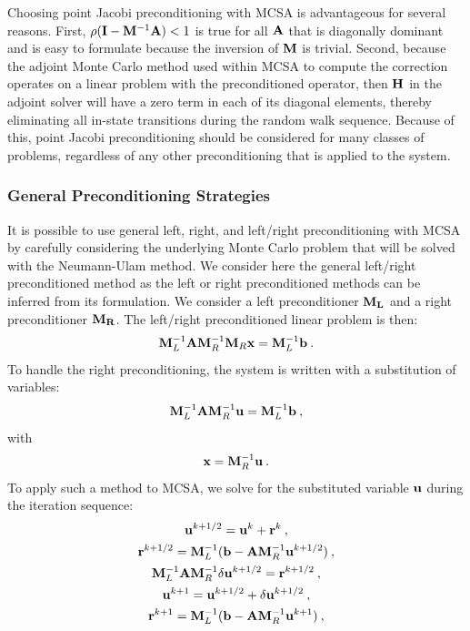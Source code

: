 Choosing point Jacobi preconditioning with MCSA is advantageous for
several reasons. First, $\rho(\mathbf{I} - \mathbf{M}^{-1}\mathbf{A}) < 1$ is true
for all $\mathbf{A}$ that is diagonally dominant and is easy to formulate
because the inversion of $\mathbf{M}$ is trivial. Second, because the
adjoint Monte Carlo method used within MCSA to compute the correction
operates on a linear problem with the preconditioned operator, then
$\mathbf{H}$ in the adjoint solver will have a zero term in each of its
diagonal elements, thereby eliminating all in-state transitions during
the random walk sequence. Because of this, point Jacobi
preconditioning should be considered for many classes of problems,
regardless of any other preconditioning that is applied to the
system.

\subsubsection{General Preconditioning Strategies}
\label{subsubsec:general_mcsa_preconditioning}
It is possible to use general left, right, and left/right
preconditioning with MCSA by carefully considering the underlying
Monte Carlo problem that will be solved with the Neumann-Ulam
method. We consider here the general left/right preconditioned method
as the left or right preconditioned methods can be inferred from its
formulation. We consider a left preconditioner $\mathbf{M_L}$ and a right
preconditioner $\mathbf{M_R}$. The left/right preconditioned linear
problem is then:
\begin{equation}
  \mathbf{M}_L^{-1}\mathbf{A}\mathbf{M}_R^{-1}\mathbf{M}_R\mathbf{x} = \mathbf{M}_L^{-1}\mathbf{b}\:.
  \label{eq:left_right_linear_problem}
\end{equation}
To handle the right preconditioning, the system is written with a
substitution of variables:
\begin{equation}
  \mathbf{M}_L^{-1}\mathbf{A}\mathbf{M}_R^{-1}\mathbf{u} = \mathbf{M}_L^{-1}\mathbf{b}\:,
  \label{eq:left_right_subs_problem}
\end{equation}
with
\begin{equation}
  \mathbf{x} = \mathbf{M}_R^{-1}\mathbf{u}\:.
  \label{eq:left_right_recover}
\end{equation}
To apply such a method to MCSA, we solve for the substituted variable
$\mathbf{u}$ during the iteration sequence:
\begin{subequations}
  \begin{gather}
    \mathbf{u}^{k+1/2} = \mathbf{u}^k + \mathbf{r}^k\:,\\
    \mathbf{r}^{k+1/2} = \mathbf{M}_L^{-1}(\mathbf{b}-\mathbf{A}\mathbf{M}_R^{-1}\mathbf{u}^{k+1/2})\:,\\ 
    \mathbf{M}_L^{-1}\mathbf{A}\mathbf{M}_R^{-1}\delta\mathbf{u}^{k+1/2} = \mathbf{r}^{k+1/2}\:,\\ 
    \mathbf{u}^{k+1} = \mathbf{u}^{k+1/2} + \delta \mathbf{u}^{k+1/2}\:,\\
    \mathbf{r}^{k+1} = \mathbf{M}_L^{-1}(\mathbf{b}-\mathbf{A}\mathbf{M}_R^{-1}\mathbf{u}^{k+1})\:,
  \end{gather}
  \label{eq:left_right_mcsa}
\end{subequations}
